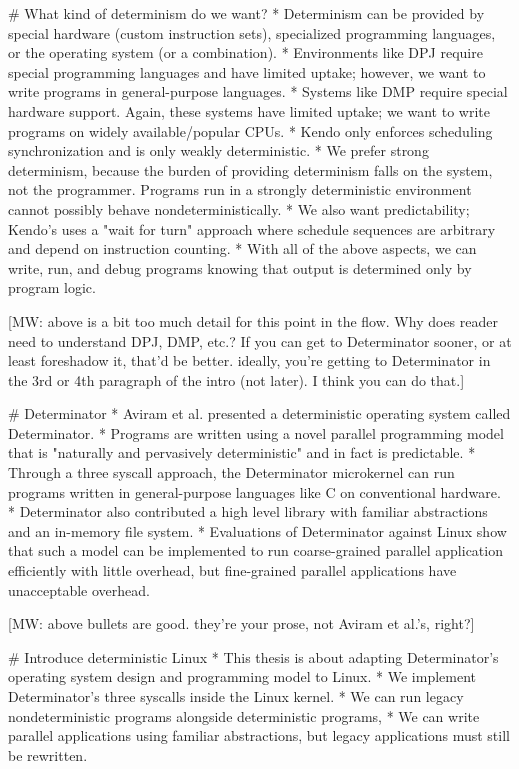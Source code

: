 # What kind of determinism do we want?
* Determinism can be provided by special hardware (custom instruction sets),
  specialized programming languages, or the operating system (or a
  combination).
* Environments like DPJ require special programming languages and have limited
  uptake; however, we want to write programs in general-purpose languages.
* Systems like DMP require special hardware support. Again, these systems have
  limited uptake; we want to write programs on widely available/popular CPUs.
* Kendo only enforces scheduling synchronization and is only weakly
  deterministic.
* We prefer strong determinism, because the burden of providing determinism
  falls on the system, not the programmer. Programs run in a strongly
  deterministic environment cannot possibly behave nondeterministically.
* We also want predictability; Kendo's uses a "wait for turn" approach where
  schedule sequences are arbitrary and depend on instruction counting.
* With all of the above aspects, we can write, run, and debug programs knowing
  that output is determined only by program logic.

[MW: above is a bit too much detail for this point in the flow. Why does
reader need to understand DPJ, DMP, etc.? If you can get to Determinator
sooner, or at least foreshadow it, that'd be better. ideally, you're
getting to Determinator in the 3rd or 4th paragraph of the intro (not
later). I think you can do that.]

# Determinator
* Aviram et al. presented a deterministic operating system called Determinator.
* Programs are written using a novel parallel programming model that is
  "naturally and pervasively deterministic" and in fact is predictable.
* Through a three syscall approach, the Determinator microkernel can run
  programs written in general-purpose languages like C on conventional hardware.
* Determinator also contributed a high level library with familiar abstractions
  and an in-memory file system.
* Evaluations of Determinator against Linux show that such a model can be
  implemented to run coarse-grained parallel application efficiently with little
  overhead, but fine-grained parallel applications have unacceptable overhead.

[MW: above bullets are good. they're your prose, not Aviram et al.'s,
right?]

# Introduce deterministic Linux
* This thesis is about adapting Determinator's operating system design and
  programming model to Linux.
* We implement Determinator's three syscalls inside the Linux kernel.
* We can run legacy nondeterministic programs alongside deterministic programs,
* We can write parallel applications using familiar abstractions, but legacy
  applications must still be rewritten.

